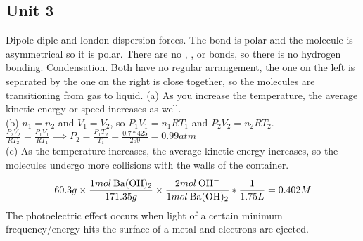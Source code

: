 \documentclass[../main.tex]{subfiles}
\begin{document}
\subsection{Unit 3}
\AnswerSet
Dipole-diple and london dispersion forces. The  bond is polar and the molecule is asymmetrical so it is polar. There are no , , or  bonds, so there is no hydrogen bonding. 
\AnswerSet
Condensation. Both have no regular arrangement, the one on the left is separated by the one on the right is close together, so the molecules are transitioning from gas to liquid.
\AnswerSet
(a) As you increase the temperature, the average kinetic energy or speed increases as well. \\
(b) \(n_1 = n_2\) and \(V_1 = V_2\), so \(P_1V_1 = n_1RT_1\) and \(P_2V_2 = n_2RT_2\). \(\frac{P_2V_2}{RT_2} = \frac{P_1V_1}{RT_1} \implies P_2 = \frac{P_1T_2}{T_1} = \frac{0.7 * 425}{299} = 0.99atm\)\\
(c) As the temperature increases, the average kinetic energy increases, so the molecules undergo more collisions with the walls of the container.  \\
\AnswerSet
\begin{equation*}
    60.3g \times \frac{1mol\hspace{0.2em}\ce{Ba(OH)2}}{171.35g} \times \frac{2mol\hspace{0.2em}\ce{OH-}}{1mol\hspace{0.2em}\ce{Ba(OH)2}} * \frac{1}{1.75L} = 0.402M
\end{equation*}
\AnswerSet
The photoelectric effect occurs when light of a certain minimum frequency/energy hits the surface of a metal and electrons are ejected. 
\end{document}
